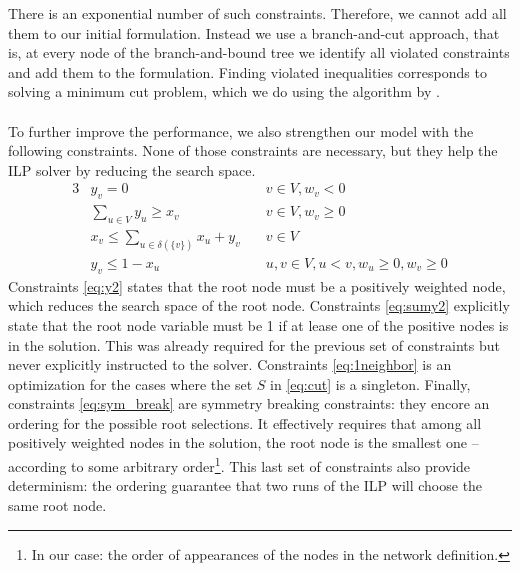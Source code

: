 		There is an exponential number of such constraints.
		Therefore, we cannot add all them to our initial formulation.
		Instead we use a branch-and-cut approach, that is, at every node of the branch-and-bound tree we identify all violated constraints and add them to the formulation.
		Finding violated inequalities corresponds to solving a minimum cut problem, which we do using the algorithm by \textcite{boykov2004experimental}.


		\paragraph{}
		To further improve the performance, we also strengthen our model with the following constraints. None of those constraints are necessary, but they help the ILP solver by reducing the search space.
		\begin{alignat}{3}
		\label{eq:y2}   & y_v = 0 & v \in V, w_v < 0\\
		\label{eq:sumy2} & \sum_{u \in V} y_u \geq x_v & v \in V, w_v\geq 0\\
		\label{eq:1neighbor} & x_v \leq \sum_{u \in \delta(\{v\})} x_u + y_v \quad & v \in V\\
		\label{eq:sym_break} & y_v \leq 1 - x_u \quad & u, v \in V, u < v, w_u \geq 0, w_v \geq 0
		\end{alignat}
		Constraints \eqref{eq:y2} states that the root node must be a positively weighted node, which reduces the search space of the root node.
		Constraints \eqref{eq:sumy2} explicitly state that the root node variable must be 1 if at lease one of the positive nodes is in the solution.
		This was already required for the previous set of constraints but never explicitly instructed to the solver.
		Constraints \eqref{eq:1neighbor} is an optimization for the cases where the set $S$ in \eqref{eq:cut} is a singleton.
		Finally, constraints \eqref{eq:sym_break} are symmetry breaking constraints: they encore an ordering for the possible root selections.
		It effectively requires that among all positively weighted nodes in the solution, the root node is the smallest one -- according to some arbitrary order\footnote{In our case: the order of appearances of the nodes in the network definition.}.
		This last set of constraints also provide determinism: the ordering guarantee that two runs of the ILP will choose the same root node.


